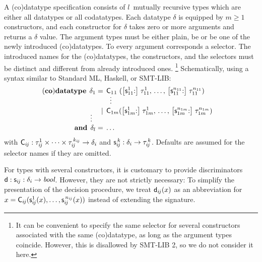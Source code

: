 \documentclass[a4paper,oribibl,envcountsame,draft]{llncs}
\newcommand\keyw[1]{\textbf{#1}}
\newcommand\const[1]{\textsf{#1}}
\newcommand\ty[1]{\textit{#1}}
\newcommand\negvthinspace{\kern-0.083333em}
\begin{document}
A (co)datatype specification consists of $l$~mutually recursive types which are
either all datatypes or all codatatypes. Each datatype $\delta$ is equipped by
$m \ge 1$ constructors, and each constructor for $\delta$ takes zero or more
arguments and returns a $\delta$ value. The argument types must be either
plain, be or be one of the newly introduced (co)datatypes. To every
argument corresponds a selector. The introduced names for the (co)datatypes, the
constructors, and the selectors must be distinct and different from already
introduced ones.%
\footnote{It can be convenient to specify the same selector
for several constructors associated with the same (co)data\-type,
as long as the argument types coincide. %
However, this is disallowed by SMT-LIB 2, so we do not consider it here.}
Schematically, using a syntax similar to Standard ML, Haskell,
or SMT-LIB:
%
\[
\begin{aligned}[t]
(\keyw{co})\keyw{datatype}\;\,
  \delta_1 & {}=\, \const{C}_{1}\rlap{${}_{1}$}\phantom{{}_{m}}(\bigl[\const{s}_{11}^1{:}\bigr]\; \tau_{11}^1, \,\ldots,\, \bigl[\const{s}_{11}^{n_{11}}{:}\bigr]\; \tau_{11}^{n_{11}}) & \\
           & {}\;\phantom{=\,}\;{} \smash{\,\,\,\vdots} \\[-\jot] %
           & {}\;\phantom{=\,}\llap{\ensuremath{\,\mid\,}}\; \const{C}_{1m}(\bigl[\const{s}_{1m}^1{:}\bigr]\; \tau_{1m}^1, \,\ldots,\, \big[\const{s}_{1m}^{n_{1m}}{:}\big]\; \tau_{1m}^{n_{1m}}) \\[-1\jot]
   \smash{\vdots\,\,\,} \\[-1\jot]
  \keyw{and}\; \,\delta_l & =\, \ldots
\end{aligned}
\]
%
with
$\const{C}_{i\negvthinspace j} : \tau_{i\negvthinspace j}^1\times\cdots\times\tau_{i\negvthinspace j}^{\,k_{\smash{i\negvthinspace j}}} \to \delta_i$
and $\const{s}_{i\negvthinspace j}^{\,k} : \delta_i \to \tau_{i\negvthinspace j}^{\,k}$. Defaults are assumed for
the selector names if they are omitted.

For types with several constructors, it is customary to provide discriminators
$\const{d} : \const{s}_{i\negvthinspace j} : \delta_i \to \ty{bool}$. However,
they are not strictly necessary:
To simplify the presentation of the decision procedure, we treat $\const{d}_{i\negvthinspace
j}(x)$ as an abbreviation for
$x = \const{C}_{i\negvthinspace j}(\const{s}_{i\negvthinspace j}^1(x), \ldots, \const{s}_{i\negvthinspace j}^{\,n_{\smash{{i\negvthinspace j}}}}(x))$
instead of extending the signature.
\end{document}

